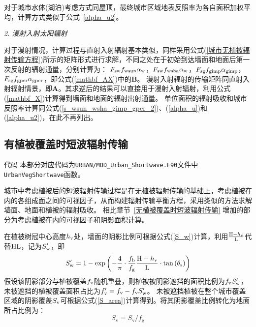 对于城市水体(湖泊)考虑方式同屋顶，最终城市区域地表反照率为各自面积加权平均，计算方式类似于公式~\eqref{alpha_u2}。

\textit{2. 漫射入射太阳辐射}

对于漫射情况，计算过程与直射入射辐射基本类似，同样采用公式(\ref{城市无植被辐射传输方程})所示的矩阵形式进行求解，不同之处在于初始到达墙面和地面后第一次反射的辐射通量，分别计算为：
$F_{\mathrm{sw}}f_{\mathrm{wsun}}\alpha_{\rm w}$，$F_{\mathrm{sw}}f_{\mathrm{wsha}}\alpha_{\rm w}$，$F_{\mathrm{sg}}f_{\mathrm{gimp}}\alpha_{\rm gimp}$，$F_{\mathrm{sg}}f_{\mathrm{gper}}\alpha_{\rm gper}$，即公式(\ref{mathbf_AX})中的$\mathbf{B}$。
漫射入射辐射的传输矩阵同直射入射辐射情景，即$\mathbf{A}$。其求逆后的结果可以直接用于漫射入射辐射，利用公式(\ref{mathbf_X})计算得到墙面和地面的辐射出射通量。
单位面积的辐射吸收和城市反照率计算同公式(\ref{s_wsun_wsha_gimp_gper_2})、(\ref{alpha_u})和(\ref{alpha_u2})，在此不再列出。

\subsection{有植被覆盖时短波辐射传输}\label{有植被覆盖时短波辐射传输}
\begin{mymdframed}{代码}
  本部分对应代码为\texttt{URBAN/MOD\_Urban\_Shortwave.F90}文件中\texttt{UrbanVegShortwave}函数。
\end{mymdframed}

城市中考虑植被后的短波辐射传输过程是在无植被辐射传输的基础上，考虑植被在内的各组成面之间的可视因子，从而构建辐射传输平衡方程，采用类似的方法求解墙面、地面和植被的辐射吸收。
相比章节~\ref{无植被覆盖时短波辐射传输} 增加的部分为考虑植被在内的可视因子和阴影面积计算。

在植被树冠中心高度$h_{\rm v}$处，墙面的阴影比例可根据公式(\ref{S_w})计算，利用$\frac{{\rm H}-h_{\rm v}}{\rm L}$代替$\rm HL$，记为$S_{\rm w}^\prime$，即
\begin{equation}
  S_{\mathrm{w}}^{\prime}=1-\exp \left(-\frac{4}{\pi} \cdot \frac{f_{\mathrm{b}}}{f_{\mathrm{g}}} \frac{{\rm H}-h_{\mathrm{v}}}{\rm L} \cdot \tan \left(\theta_{\mathrm{s}}\right)\right)
\end{equation}
假设该阴影部分与植被覆盖$f_{\rm v}$随机重叠，则植被被阴影遮挡的面积比例为$f_{\rm v}S_{\mathrm {w}} ^\prime$，未被遮挡的植被覆盖面积占比为$f_{\rm v}^\prime=f_{\rm v}-f_{\rm v}S_{\rm w}^\prime$。
未被遮挡植被在整个城市覆盖区域的阴影覆盖$S_{\rm v}$可根据公式(\ref{S_area})计算得到。将其阴影覆盖比例转化为地面所占比例为：
\begin{equation}\label{S_v2}
  S_{\mathrm{v}}=S_{\mathrm{v}} / f_{\mathrm{g}}
\end{equation}


